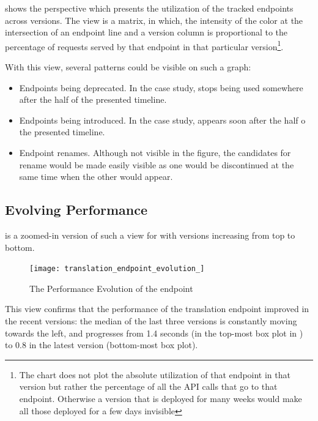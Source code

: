    shows the  perspective which presents the utilization of the tracked endpoints across versions. The view is a matrix, in which, the intensity of the color at the intersection of an endpoint line and a version column is proportional to the percentage of requests served by that endpoint in that particular version\footnote{The chart does not plot the absolute utilization of that endpoint in that version but rather the percentage of all the API calls that go to that endpoint. Otherwise a version that is deployed for many weeks would make all those deployed for a few days invisible}.

  With this view, several patterns could be visible on such a graph:
  \begin{itemize}
    
    \item Endpoints being deprecated. In the case study, \epFeedItems stops being used somewhere after the half of the presented timeline.

    \item Endpoints being introduced. In the case study, \epTopArticles appears soon after the half o the presented timeline. 

    \item Endpoint renames. Although not visible in the figure, the candidates for rename would be made easily visible as one would be discontinued at the same time when the other would appear. 

  \end{itemize}


  \subsection*{Evolving Performance}

     is a zoomed-in version of such a view for \epTranslationsColor with versions increasing from top to bottom.

    \begin{figure}[h!]
      \centering
      \texttt{[image: translation\_endpoint\_evolution\_]}
      \caption{The Performance Evolution of the \epTranslations endpoint}
      \label{fig:tee}
    \end{figure}


  This view confirms that the performance of the translation endpoint improved in the recent versions: the median of the last three versions is constantly moving towards the left, and progresses from 1.4 seconds (in the top-most box plot in ) to 0.8 in the latest version (bottom-most box plot).


